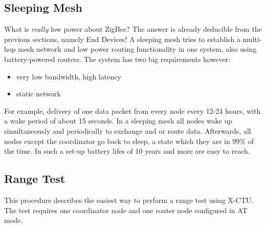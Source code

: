 \vspace{0.5cm}
\subsection{Sleeping Mesh}
What is \textit{really} low power about ZigBee? The answer is already deducible from the previous sections, namely End Devices! A sleeping mesh tries to establish a multi-hop mesh network and low power routing functionality in one system, also using battery-powered routers. The system has two big requirements however:
\begin{itemize}
\item very low bandwidth, high latency
\item static network
\end{itemize}
For example, delivery of one data packet from every node every 12-24 hours, with a wake period of about 15 seconds. In a sleeping mesh all nodes wake up simultaneously and periodically to exchange and or route data. Afterwards, all nodes except the coordinator go back to sleep, a state which they are in 99\% of the time. In such a set-up battery lifes of 10 years and more are easy to reach.
\vfill
\pagebreak
\subsection{Range Test}
This procedure describes the easiest way to perform a range test using X-CTU. The test requires one coordinator node and one router node configured in AT mode.\\

